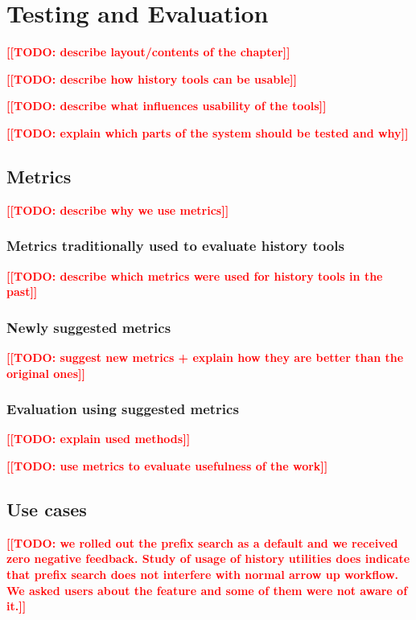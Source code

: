 \documentclass[thesis=M,english]{FITthesis}[2012/10/20]
\newcommand{\todotext}[1]{\textcolor{red}{\textbf{[[#1]]}}}
\newcommand{\blind}[1][1]{\textcolor{mygray}{\Blindtext[#1][1]}}
\begin{document}
\blind[2]


\chapter{Testing and Evaluation}

\todotext{TODO: describe layout/contents of the chapter}

\todotext{TODO: describe how history tools can be usable}

\todotext{TODO: describe what influences usability of the tools}

\todotext{TODO: explain which parts of the system should be tested and why}

\blind[3]

\section{Metrics}

\todotext{TODO: describe why we use metrics}

\subsection{Metrics traditionally used to evaluate history tools}

\todotext{TODO: describe which metrics were used for history tools in the past}

\subsection{Newly suggested metrics}

\todotext{TODO: suggest new metrics + explain how they are better than the original ones}

\subsection{Evaluation using suggested metrics}

\todotext{TODO: explain used methods}

\todotext{TODO: use metrics to evaluate usefulness of the work}


\section{Use cases}

\todotext{TODO: we rolled out the prefix search as a default and we received zero negative feedback. Study of usage of history utilities does indicate that prefix search does not interfere with normal arrow up workflow. We asked users about the feature and some of them were not aware of it.}
\end{document}
